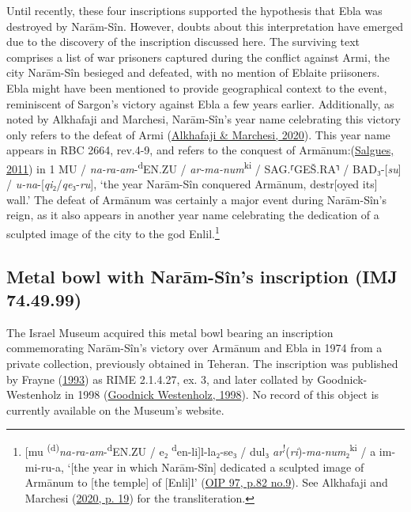 \documentclass[
]{book}
\begin{document}
Until recently, these four inscriptions supported the hypothesis that Ebla was destroyed by Narām-Sîn. However, doubts about this interpretation have emerged due to the discovery of the inscription discussed here. The surviving text comprises a list of war prisoners captured during the conflict against Armi, the city Narām-Sîn besieged and defeated, with no mention of Eblaite priisoners. Ebla might have been mentioned to provide geographical context to the event, reminiscent of Sargon's victory against Ebla a few years earlier. Additionally, as noted by Alkhafaji and Marchesi, Narām-Sîn's year name celebrating this victory only refers to the defeat of Armi (\protect\hyperlink{ref-AlkhafajiMarchesi2020}{Alkhafaji \& Marchesi, 2020}). This year name appears in RBC 2664, rev.4-9, and refers to the conquest of Armānum:(\protect\hyperlink{ref-Salgues2011}{Salgues, 2011}) in 1 MU / \emph{na-ra-am}-\textsuperscript{d}EN.ZU / \emph{ar-ma-num}\textsuperscript{ki} / SAG.⸢GEŠ.RA⸣ / BAD₃-{[}\emph{su}{]} / \emph{u-na}-{[}\emph{qi}₂/\emph{qe}₃-\emph{ru}{]}, `the year Narām-Sîn conquered Armānum, destr{[}oyed its{]} wall.' The defeat of Armānum was certainly a major event during Narām-Sîn's reign, as it also appears in another year name celebrating the dedication of a sculpted image of the city to the god Enlil.\footnote{{[}mu \textsuperscript{(d)}\emph{na-ra-am}-\textsuperscript{d}EN.ZU / e₂ \textsuperscript{d}en-li{]}l-la₂-se₃ / dul₃ \emph{ar}\textsuperscript{!}(\emph{ri})-\emph{ma-num}₂\textsuperscript{ki} / a im-mi-ru-a, `{[}the year in which Narām-Sîn{]} dedicated a sculpted image of Armānum to {[}the temple{]} of {[}Enli{]}l' (\href{https://cdli.mpiwg-berlin.mpg.de/artifacts/216062}{OIP 97, p.82 no.9}). See Alkhafaji and Marchesi (\protect\hyperlink{ref-AlkhafajiMarchesi2020}{2020, p. 19}) for the transliteration.}

\hypertarget{IMJ744999}{%
\subsection{Metal bowl with Narām-Sîn's inscription (IMJ 74.49.99)}\label{IMJ744999}}

The Israel Museum acquired this metal bowl bearing an inscription commemorating Narām-Sîn's victory over Armānum and Ebla in 1974 from a private collection, previously obtained in Teheran. The inscription was published by Frayne (\protect\hyperlink{ref-Frayne1993}{1993}) as RIME 2.1.4.27, ex. 3, and later collated by Goodnick-Westenholz in 1998 (\protect\hyperlink{ref-GoodnickWestenholz1998}{Goodnick Westenholz, 1998}). No record of this object is currently available on the Museum's website.
\end{document}
